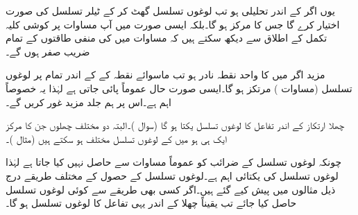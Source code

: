 یوں اگر  کے اندر  تحلیلی ہو تب لوغوں تسلسل  گھٹ کر  کے ٹیلر تسلسل کی صورت اختیار کرے گا جس کا مرکز  ہو گا۔بلکہ ایسی صورت میں آپ مساوات  پر کوشی  کلیہ تکمل کے اطلاق سے دیکھ سکتے ہیں کہ مساوات  میں   کی منفی طاقتوں کے تمام  ضریب  صفر ہوں گے۔

مزید اگر  میں  کا  واحد نقطہ نادر  ہو تب ماسوائے نقطہ  کے  کے اندر تمام  پر  لوغوں تسلسل (مساوات ) مرتکز ہو گا۔ایسی صورت حال عموماً پائی جاتی ہے لہٰذا یہ خصوصاً  اہم ہے۔اس پر ہم جلد مزید غور کریں گے۔

چھلا ارتکاز کے اندر تفاعل  کا لوغوں تسلسل یکتا ہو گا (سوال )۔البتہ دو مختلف چھلوں جن کا مرکز ایک ہی ہو میں  کے لوغوں تسلسل مختلف ہو سکتے ہیں (مثال )۔

چونکہ لوغوں تسلسل کے ضرائب کو عموماً مساوات  سے حاصل نہیں کیا جاتا ہے لہٰذا لوغوں تسلسل کی یکتائی اہم ہے۔لوغوں تسلسل کے حصول کے مختلف طریقے درج ذیل مثالوں میں پیش کیے گئے ہیں۔اگر کسی بھی طریقے  سے کوئی لوغوں تسلسل حاصل کیا جائے تب یقیناً چھلا کے اندر یہی تفاعل کا لوغوں تسلسل ہو گا۔ 

